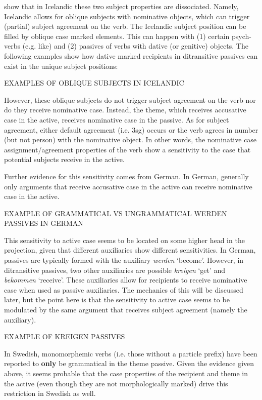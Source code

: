\cite{Zaenen.1985} show that in Icelandic these two subject properties are dissociated. Namely, Icelandic allows for oblique subjects with nominative objects, which can trigger (partial) subject agreement on the verb. The Icelandic subject position can be filled by oblique case marked elements. This can happen with (1) certain psych-verbs (e.g. like) and (2) passives of verbs with dative (or genitive) objects. The following examples show how dative marked recipients in ditransitive passives can exist in the unique subject positions:
\bigskip

EXAMPLES OF OBLIQUE SUBJECTS IN ICELANDIC
\bigskip

However, these oblique subjects do not trigger subject agreement on the verb nor do they receive nominative case. Instead, the theme, which receives accusative case in the active, receives nominative case in the passive. As for subject agreement, either default agreement (i.e. 3sg) occurs or the verb agrees in number (but not person) with the nominative object. In other words, the nominative case assignment/agreement properties of the verb show a sensitivity to the case that potential subjects receive in the active.

Further evidence for this sensitivity comes from German. In German, generally only arguments that receive accusative case in the active can receive nominative case in the active.
\bigskip

EXAMPLE OF GRAMMATICAL VS UNGRAMMATICAL WERDEN PASSIVES IN GERMAN
\bigskip

This sensitivity to active case seems to be located on some higher head in the projection, given that different auxiliaries show different sensitivities. In German, passives are typically formed with the auxiliary \textit{werden} `become'. However, in ditransitive passives, two other auxiliaries are possible \textit{kreigen} `get' and \textit{bekommen} `receive'. These auxiliaries allow for recipients to receive nominative case when used as passive auxiliaries. The mechanics of this will be discussed later, but the point here is that the sensitivity to active case seems to be modulated by the same argument that receives subject agreement (namely the auxiliary).
\bigskip

EXAMPLE OF KREIGEN PASSIVES
\bigskip

In Swedish, monomorphemic verbs (i.e. those without a particle prefix) have been reported to \textbf{only} be grammatical in the theme passive. Given the evidence given above, it seems probable that the case properties of the recipient and theme in the active (even though they are not morphologically marked) drive this restriction in Swedish as well.

